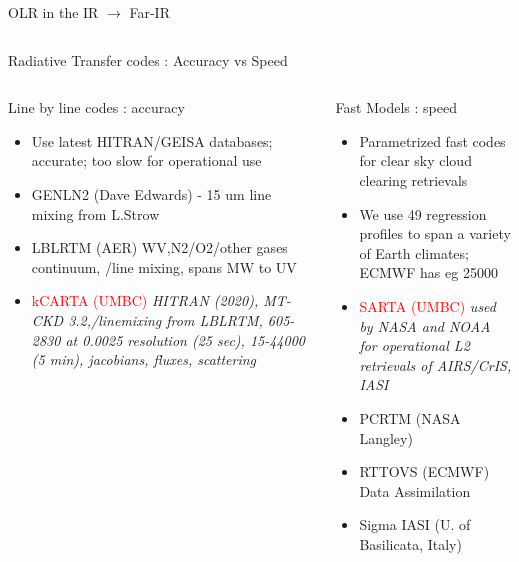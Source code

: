 \documentclass[10pt,t]{beamer}
\begin{document}
\begin{frame}{OLR in the IR $\rightarrow$ Far-IR}
\begin{block}{}
\begin{columns}
\end{columns}

\end{block}
\end{frame}
\begin{frame}[shrink=2]{Radiative Transfer codes : Accuracy vs Speed}
\vspace{-0.1in}
\begin{columns}

\begin{column}{0.55\columnwidth}
\begin{block}{Line by line codes : accuracy}
  \begin{itemize}
  \item Use latest HITRAN/GEISA databases; accurate; too slow for operational use
  \item GENLN2 (Dave Edwards) - 15 um \cd line mixing from L.Strow
  \item LBLRTM (AER) WV,N2/O2/other gases continuum, \cd/\methane line mixing, spans MW to UV
  \item \textcolor{red}{kCARTA (UMBC)} \emph{HITRAN (2020), MT-CKD 3.2,\cd/\methane linemixing from LBLRTM, 
        605-2830 \wn at 0.0025 \wn resolution (25 sec), 15-44000 \wn (5 min), jacobians, 
        fluxes, scattering}
  \end{itemize}
\end{block}
\end{column}

\begin{column}{0.55\columnwidth}
\begin{block}{Fast Models : speed}
  \begin{itemize}
  \item Parametrized fast codes for clear sky cloud clearing retrievals
  \item We use 49 regression profiles to span a variety of Earth climates; ECMWF has eg 25000
  \item \textcolor{red}{SARTA (UMBC)} \emph{used by NASA and NOAA for operational L2 retrievals of AIRS/CrIS, IASI}
  \item PCRTM (NASA Langley)
  \item RTTOVS (ECMWF) Data Assimilation
  \item Sigma IASI (U. of Basilicata, Italy) 
  \end{itemize}
\end{block}
\end{column}
\end{columns}
\end{frame}
\end{document}
